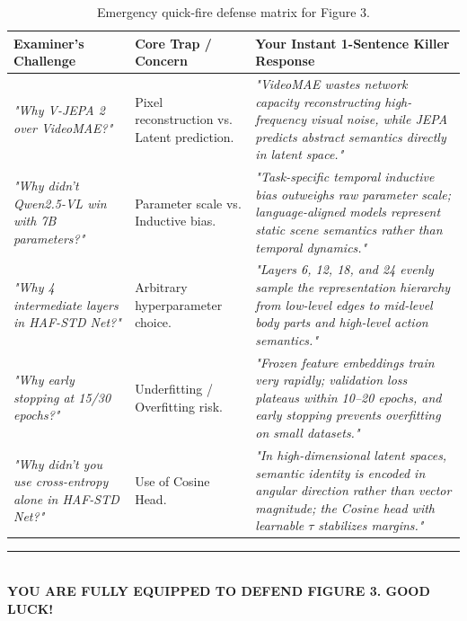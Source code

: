 \documentclass[a4paper, 11pt]{article}
\begin{document}
\begin{table}[h!]
\centering
\small
\renewcommand{\arraystretch}{1.3}
\begin{tabularx}{\textwidth}{p{3.8cm}p{4.8cm}X}
\toprule
\textbf{Examiner's Challenge} & \textbf{Core Trap / Concern} & \textbf{Your Instant 1-Sentence Killer Response} \\
\midrule
\textit{"Why V-JEPA 2 over VideoMAE?"} & Pixel reconstruction vs. Latent prediction. & \textit{"VideoMAE wastes network capacity reconstructing high-frequency visual noise, while JEPA predicts abstract semantics directly in latent space."} \\
\midrule
\textit{"Why didn't Qwen2.5-VL win with 7B parameters?"} & Parameter scale vs. Inductive bias. & \textit{"Task-specific temporal inductive bias outweighs raw parameter scale; language-aligned models represent static scene semantics rather than temporal dynamics."} \\
\midrule
\textit{"Why 4 intermediate layers in HAF-STD Net?"} & Arbitrary hyperparameter choice. & \textit{"Layers 6, 12, 18, and 24 evenly sample the representation hierarchy from low-level edges to mid-level body parts and high-level action semantics."} \\
\midrule
\textit{"Why early stopping at 15/30 epochs?"} & Underfitting / Overfitting risk. & \textit{"Frozen feature embeddings train very rapidly; validation loss plateaus within 10--20 epochs, and early stopping prevents overfitting on small datasets."} \\
\midrule
\textit{"Why didn't you use cross-entropy alone in HAF-STD Net?"} & Use of Cosine Head. & \textit{"In high-dimensional latent spaces, semantic identity is encoded in angular direction rather than vector magnitude; the Cosine head with learnable $\tau$ stabilizes margins."} \\
\bottomrule
\end{tabularx}
\caption{Emergency quick-fire defense matrix for Figure 3.}
\end{table}

\vspace{0.3cm}
\begin{center}
\rule{0.6\textwidth}{0.8pt}\\[4pt]
\textbf{\color{primaryblue}YOU ARE FULLY EQUIPPED TO DEFEND FIGURE 3. GOOD LUCK!}
\end{center}
\end{document}
